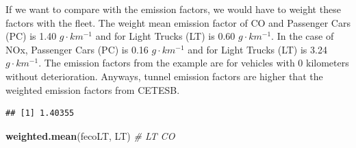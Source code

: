 \documentclass[12pt,graybox,envcountchap,sectrefs]{krantz}
\makeatletter
\newenvironment{Shaded}{\begin{snugshade}}{\end{snugshade}}
\newcommand{\KeywordTok}[1]{\textcolor[rgb]{0.13,0.29,0.53}{\textbf{#1}}}
\newcommand{\DataTypeTok}[1]{\textcolor[rgb]{0.13,0.29,0.53}{#1}}
\newcommand{\DecValTok}[1]{\textcolor[rgb]{0.00,0.00,0.81}{#1}}
\newcommand{\StringTok}[1]{\textcolor[rgb]{0.31,0.60,0.02}{#1}}
\newcommand{\CommentTok}[1]{\textcolor[rgb]{0.56,0.35,0.01}{\textit{#1}}}
\newcommand{\OtherTok}[1]{\textcolor[rgb]{0.56,0.35,0.01}{#1}}
\newcommand{\OperatorTok}[1]{\textcolor[rgb]{0.81,0.36,0.00}{\textbf{#1}}}
\newcommand{\NormalTok}[1]{#1}
\newenvironment{kframe}{%
\medskip{}
\setlength{\fboxsep}{.8em}
 \def\at@end@of@kframe{}%
 \ifinner\ifhmode%
  \def\at@end@of@kframe{\end{minipage}}%
  \begin{minipage}{\columnwidth}%
 \fi\fi%
 \def\FrameCommand##1{\hskip\@totalleftmargin \hskip-\fboxsep
 \colorbox{shadecolor}{##1}\hskip-\fboxsep
     \hskip-\linewidth \hskip-\@totalleftmargin \hskip\columnwidth}%
 \MakeFramed {\advance\hsize-\width
   \@totalleftmargin\z@ \linewidth\hsize
   \@setminipage}}%
 {\par\unskip\endMakeFramed%
 \at@end@of@kframe}
\renewenvironment{Shaded}{\begin{kframe}}{\end{kframe}}
\theoremstyle{definition}
\theoremstyle{definition}
\theoremstyle{definition}
\theoremstyle{remark}
\makeatother
\begin{document}
If we want to compare with the \citet{CETESB2015} emission factors, we
would have to weight these factors with the fleet. The weight mean
emission factor of CO and Passenger Cars (PC) is 1.40
\(g \cdot km^{-1}\) and for Light Trucks (LT) is 0.60
\(g \cdot km^{-1}\). In the case of NOx, Passenger Cars (PC) is 0.16
\(g \cdot km^{-1}\) and for Light Trucks (LT) is 3.24
\(g \cdot km^{-1}\). The emission factors from the example are for
vehicles with 0 kilometers without deterioration. Anyways, tunnel
emission factors are higher that the weighted emission factors from
CETESB.

\begin{Shaded}
\end{Shaded}

\begin{verbatim}
## [1] 1.40355
\end{verbatim}

\begin{Shaded}
\begin{Highlighting}[]
\KeywordTok{weighted.mean}\NormalTok{(fecoLT, LT)  }\CommentTok{# LT CO}
\end{Highlighting}
\end{Shaded}
\end{document}
